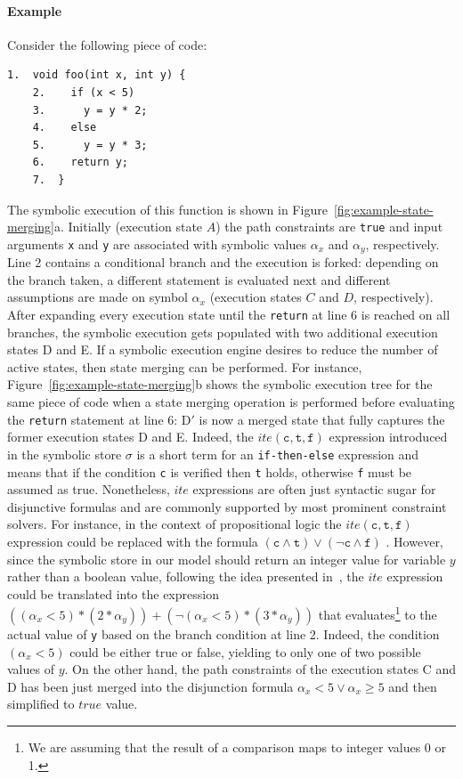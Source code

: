\paragraph{Example} Consider the following piece of code:
    \begin{lstlisting}[basicstyle=\ttfamily\small]
    1.  void foo(int x, int y) {
    2.    if (x < 5)
    3.      y = y * 2;
    4.    else
    5.      y = y * 3;
    6.    return y;
    7.  }
    \end{lstlisting}
The symbolic execution of this function is shown in Figure~\ref{fig:example-state-merging}a. Initially (execution state $A$) the path constraints are {\tt true} and input arguments {\tt x} and {\tt y} are associated with symbolic values $\alpha_x$ and $\alpha_y$, respectively. Line 2 contains a conditional branch and the execution is forked: depending on the branch taken, a different statement is evaluated next and different assumptions are made on symbol $\alpha_x$ (execution states $C$ and $D$, respectively). After expanding every execution state until the {\tt return} at line 6 is reached on all branches, the symbolic execution gets populated with two additional execution states D and E. If a symbolic execution engine desires to reduce the number of active states, then state merging can be performed. For instance, Figure~\ref{fig:example-state-merging}b shows the symbolic execution tree for the same piece of code when a state merging operation is performed before evaluating the {\tt return} statement at line 6: D$'$ is now a merged state that fully captures the former execution states D and E. Indeed, the $ite(\texttt{c}, \texttt{t}, \texttt{f})$ expression introduced in the symbolic store $\sigma$ is a short term for an {\tt if-then-else} expression and means that if the condition {\tt c} is verified then {\tt t} holds, otherwise {\tt f} must be assumed as true. Nonetheless, $ite$ expressions are often just syntactic sugar for disjunctive formulas and are commonly supported by most prominent constraint solvers. For instance, in the context of propositional logic the $ite(\texttt{c}, \texttt{t}, \texttt{f})$  expression could be replaced with the formula $(\texttt{c} \wedge \texttt{t}) \vee (\neg\texttt{c} \wedge \texttt{f})$ . However, since the symbolic store in our model should return an integer value for variable $y$ rather than a boolean value, following the idea presented in~\cite{KP-PP05}, the $ite$ expression could be translated into the expression $((\alpha_x < 5) * (2 * \alpha_y)) + (\neg(\alpha_x < 5) * (3 * \alpha_y))$ that evaluates\footnote{We are assuming that the result of a comparison maps to integer values 0 or 1.} to the actual value of {\tt y} based on the branch condition at line 2. Indeed, the condition $(\alpha_x < 5)$ could be either true or false, yielding to only one of two possible values of $y$. On the other hand, the path constraints of the execution states C and D has been just merged into the disjunction formula $\alpha_x < 5 \vee \alpha_x \geq 5$ and then simplified to $true$ value.

